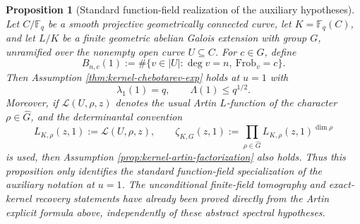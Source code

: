 \documentclass[12pt,a4paper]{article}
\theoremstyle{plain}
\newtheorem{proposition}[theorem]{Proposition}
\theoremstyle{definition}
\numberwithin{equation}{section}
\newcommand{\FF}{\mathbb{F}}
\begin{document}
\begin{proposition}[Standard function-field realization of the auxiliary hypotheses]\label{prop:function-field-chebotarev-realization}
Let \(C/\FF_q\) be a smooth projective geometrically connected curve, let \(K=\FF_q(C)\), and let \(L/K\) be a finite geometric abelian Galois extension with group \(G\), unramified over the nonempty open curve \(U\subseteq C\). For \(c\in G\), define
\[
B_{n,c}(1):=\#\{v\in |U|:\deg v=n,\ \mathrm{Frob}_v=c\}.
\]
Then Assumption \ref{thm:kernel-chebotarev-exp} holds at \(u=1\) with
\[
\lambda_1(1)=q,
\qquad
\Lambda(1)\le q^{1/2}.
\]
Moreover, if \(\mathcal L(U,\rho,z)\) denotes the usual Artin \(L\)-function of the character \(\rho\in\widehat G\), and the determinantal convention
\[
L_{K,\rho}(z,1):=\mathcal L(U,\rho,z),
\qquad
\zeta_{K,G}(z,1):=\prod_{\rho\in\widehat G}L_{K,\rho}(z,1)^{\dim\rho}
\]
is used, then Assumption \ref{prop:kernel-artin-factorization} also holds. Thus this proposition only identifies the standard function-field specialization of the auxiliary notation at \(u=1\). The unconditional finite-field tomography and exact-kernel recovery statements have already been proved directly from the Artin explicit formula above, independently of these abstract spectral hypotheses.
\end{proposition}
\end{document}
